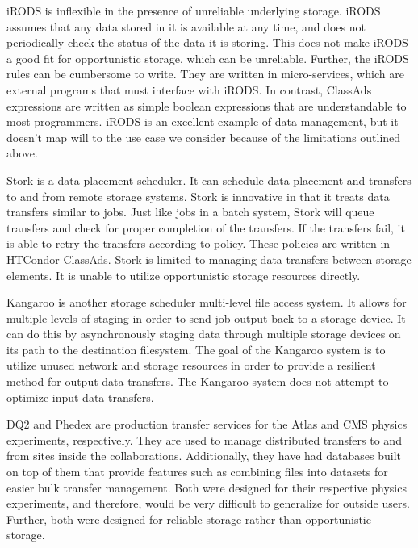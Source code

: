 iRODS is inflexible in the presence of unreliable underlying storage.  iRODS assumes that any data stored in it is available at any time, and does not periodically check the status of the data it is storing.  This does not make iRODS a good fit for opportunistic storage, which can be unreliable.  Further, the iRODS rules can be cumbersome to write.  They are written in micro-services, which are external programs that must interface with iRODS.  In contrast, ClassAds expressions are written as simple boolean expressions that are understandable to most programmers.  iRODS is an excellent example of data management, but it doesn't map will to the use case we consider because of the limitations outlined above.

Stork \cite{kosar2004stork} is a data placement scheduler.  It can schedule data placement and transfers to and from remote storage systems.  Stork is innovative in that it treats data transfers similar to jobs.  Just like jobs in a batch system, Stork will queue transfers and check for proper completion of the transfers.  If the transfers fail, it is able to retry the transfers according to policy.  These policies are written in HTCondor ClassAds.  Stork is limited to managing data transfers between storage elements.  It is unable to utilize opportunistic storage resources directly.

Kangaroo \cite{thain2001kangaroo} is another storage scheduler multi-level file access system.  It allows for multiple levels of staging in order to send job output back to a storage device.  It can do this by asynchronously staging data through multiple storage devices on its path to the destination filesystem.  The goal of the Kangaroo system is to utilize unused network and storage resources in order to provide a resilient method for output data transfers.  The Kangaroo system does not attempt to optimize input data transfers.


DQ2 \cite{branco2008managing} and Phedex \cite{rehn2006phedex} are production transfer services for the Atlas and CMS physics experiments, respectively.  They are used to manage distributed transfers to and from sites inside the collaborations.  Additionally, they have had databases built on top of them that provide features such as combining files into datasets for easier bulk transfer management.  Both were designed for their respective physics experiments, and therefore, would be very difficult to generalize for outside users.  Further, both were designed for reliable storage rather than opportunistic storage.

